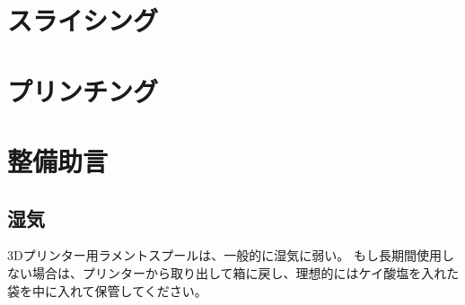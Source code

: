 \documentclass[10pt,a4paper,onecolumn,notitlepage,oneside,dvipdfmx]{article}
\begin{document}
\section{スライシング}
\label{sec:org2db262d}

\section{プリンチング}
\label{sec:orgacab8a9}

\section{整備助言}
\label{sec:orgd940f5d}

\subsection{湿気}
\label{sec:org86f712d}
3Dプリンター用ラメントスプールは、一般的に湿気に弱い。
もし長期間使用しない場合は、プリンターから取り出して箱に戻し、理想的にはケイ酸塩を入れた袋を中に入れて保管してください。
\end{document}
